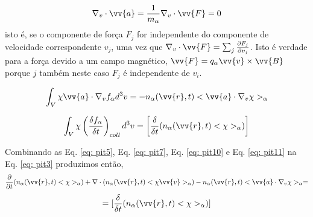 \documentclass[12pt,oneside,a4paper]{abntex2}
\theoremstyle{definition}  %
\begin{document}
\begin{equation}
\label{eq: pit9}
\nabla_v \cdot \vv{a} = \frac{1}{m_\alpha} \nabla_v \cdot \vv{F} = 0
\end{equation}
isto é, se o componente de força $F_j$ for independente do componente de velocidade correspondente $v_j$, uma vez que $\nabla_v \cdot \vv{F} = \sum_j \frac{\partial F_j}{\partial v_j}$. Isto é verdade para a força devido a um campo magnético, $\vv{F} = q_\alpha \vv{v} \times \vv{B}$ porque $j$ também neste caso $F_j$ é independente de $v_i$.

\begin{equation}
\label{eq: pit10}
\int_V \chi \vv{a} \cdot \nabla_v f_\alpha d^3 v = -n_\alpha(\vv{r},t)<\vv{a} \cdot \nabla_v \chi>_\alpha
\end{equation}

\begin{equation}
\label{eq: pit11}
\int_V \chi \left( \frac{\delta f_\alpha}{\delta t} \right)_{coll} d^3 v = \left[\frac{\delta}{\delta t}(n_\alpha(\vv{r},t)<\chi>_\alpha)\right]
\end{equation}

Combinando as Eq. \ref{eq: pit5}, Eq. \ref{eq: pit7}, Eq. \ref{eq: pit10} e Eq. \ref{eq: pit11} na Eq. \ref{eq: pit3} produzimos então,
\begin{equation}
\label{eq: pit12}
\frac{\partial }{\partial t}(n_\alpha(\vv{r},t)<\chi>_\alpha) + \nabla \cdot (n_\alpha(\vv{r},t)<\chi \vv{v} >_\alpha) - n_\alpha(\vv{r},t)<\vv{a} \cdot \nabla_v \chi>_\alpha = 
\end{equation}
\begin{equation*}
=[\frac{\delta}{\delta t}(n_\alpha(\vv{r},t)<\chi>_\alpha)]
\end{equation*}
\end{document}
